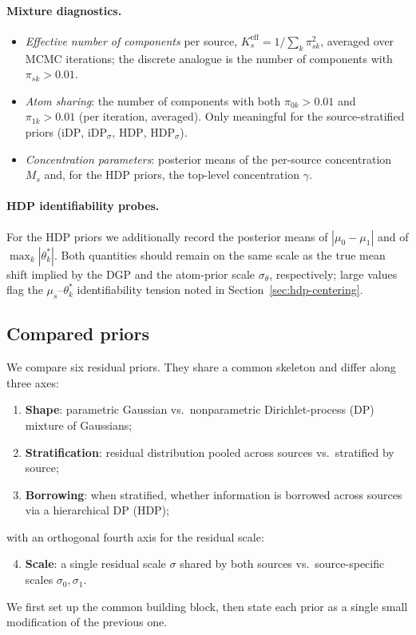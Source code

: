 \documentclass[11pt]{article}
\theoremstyle{plain}
\theoremstyle{definition}
\theoremstyle{remark}
\newcommand{\1}{\mathds{1}}
\newcommand{\miDP}{\ensuremath{\mathrm{iDP}}}
\newcommand{\miDPs}{\ensuremath{\mathrm{iDP}_\sigma}}
\newcommand{\mHDP}{\ensuremath{\mathrm{HDP}}}
\newcommand{\mHDPs}{\ensuremath{\mathrm{HDP}_\sigma}}
\begin{document}
\paragraph{Mixture diagnostics.}
\begin{itemize}
  \item \emph{Effective number of components} per source,
    $K^{\text{eff}}_s = 1 / \sum_k \pi_{sk}^2$, averaged over MCMC
    iterations; the discrete analogue is the number of components
    with $\pi_{sk} > 0.01$.
  \item \emph{Atom sharing}: the number of components with both
    $\pi_{0k} > 0.01$ and $\pi_{1k} > 0.01$ (per iteration, averaged).
    Only meaningful for the source-stratified priors
    (\miDP, \miDPs, \mHDP, \mHDPs).
  \item \emph{Concentration parameters}: posterior means of the
    per-source concentration $M_s$ and, for the HDP priors, the
    top-level concentration $\gamma$.
\end{itemize}

\paragraph{HDP identifiability probes.}
For the HDP priors we additionally record the posterior means of
$|\mu_0 - \mu_1|$ and of $\max_k |\theta_k^*|$. Both quantities should
remain on the same scale as the true mean shift implied by the DGP and
the atom-prior scale $\sigma_\theta$, respectively; large values flag
the $\mu_s$--$\theta_k^*$ identifiability tension noted in
Section~\ref{sec:hdp-centering}.

\subsection{Compared priors}
\label{sec:sim-compared}

We compare six residual priors. They share a common skeleton and
differ along three axes:
\begin{enumerate}
  \item \textbf{Shape}: parametric Gaussian vs.\ nonparametric
    Dirichlet-process (DP) mixture of Gaussians;
  \item \textbf{Stratification}: residual distribution pooled across
    sources vs.\ stratified by source;
  \item \textbf{Borrowing}: when stratified, whether information is
    borrowed across sources via a hierarchical DP (HDP);
\end{enumerate}
with an orthogonal fourth axis for the residual scale:
\begin{enumerate}
  \setcounter{enumi}{3}
  \item \textbf{Scale}: a single residual scale $\sigma$ shared by
    both sources vs.\ source-specific scales $\sigma_0, \sigma_1$.
\end{enumerate}
We first set up the common building block, then state each prior as a
single small modification of the previous one.
\end{document}
